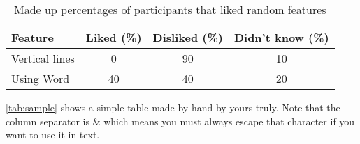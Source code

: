 \begin{table}
    \centering
    \begin{tabular}{lccc}
        \toprule
        \textbf{Feature} & \textbf{Liked (\%)} & \textbf{Disliked (\%)} & \textbf{Didn't know (\%)}  \\ \midrule
        Vertical lines & 0 & 90 & 10 \\
        Using Word & 40 & 40 & 20 \\
        \bottomrule
    \end{tabular}
    \caption{Made up percentages of participants that liked random features}
    \label{tab:sample}
\end{table}

\noindent \autoref{tab:sample} shows a simple table made by hand by yours truly. Note that the column separator is \& which means you must always escape that character if you want to use it in text.



